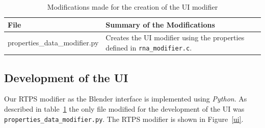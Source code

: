 \begin{table}[htdp]
\caption{Modifications made for the creation of the UI modifier}
\begin{center}
\begin{tabular}{|p{6cm}|p{6cm}|}
\hline 
\textbf{File} & \textbf{Summary of the Modifications} \\\hline 
properties\_data\_modifier.py & Creates the UI modifier using the properties defined in \texttt{rna\_modifier.c}. \\
\hline 
\end{tabular}
\end{center}
\label{uiTable}
\end{table}

\subsection{Development of the UI}
Our RTPS modifier as the Blender interface is implemented using \textit{Python}. As described in table~\ref{uiTable} the only file modified for the development of the UI was \texttt{properties\_data\_modifier.py}. The RTPS modifier is shown in Figure~\ref{ui}.

